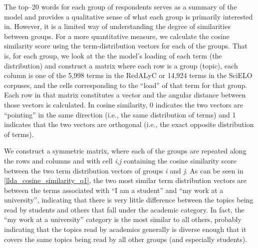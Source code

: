 The top--20 words for each group of respondents serves as a summary of the model and provides a qualitative sense of what each group is primarily interested in. However, it is a limited way of understanding the degree of similarities between groups. For a more quantitative measure, we calculate the cosine similarity score using the term-distribution vectors for each of the groups. That is, for each group, we look at the the model's loading of each term (the distribution) and construct a matrix where each row is a group (topic), each column is one of the 5,998 terms in the RedALyC or 14,924 terms in the SciELO corpuses, and the cells corresponding to the ``load'' of that term for that group. Each row in that matrix constitutes a vector and the angular distance between those vectors is calculated. In cosine similarity, 0 indicates the two vectors are ``pointing'' in the same direction (i.e., the same distribution of terms) and 1 indicates that the two vectors are orthogonal (i.e., the exact opposite distribution of terms).

We construct a symmetric matrix, where each of the groups are repeated along the rows and columns and with cell \emph{i,j} containing the cosine similarity score between the two term distribution vectors of groups \emph{i} and \emph{j}. As can be seen in \autoref{llda_cosine_similarity_q1}, the two most similar term distribution vectors are between the terms associated with ``I am a student'' and ``my work at a university'', indicating that there is very little difference between the topics being read by students and others that fall under the academic category. In fact, the ``my work at a university'' category is the most similar to all others, probably indicating that the topics read by academics generally is diverse enough that it covers the same topics being read by all other groups (and especially students).

